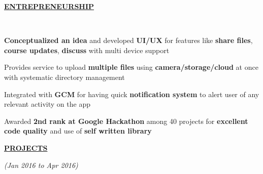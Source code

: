\documentclass[a4paper]{deedy-resume} %
\begin{document}

\sectionspace

{\uppercase\uline{\textbf{\large{Entrepreneurship}}\hfill}}
\microspace

\hfill \\

\begin{tightitemize}
\item \textbf{Conceptualized an idea} and developed \textbf{UI/UX} for features like \textbf{share files}, \textbf{course updates}, \textbf{discuss} with multi device support
\item Provides service to upload \textbf{multiple files} using \textbf{camera/storage/cloud} at once with systematic directory management
\item Integrated with \textbf{GCM} for having quick \textbf{notification system} to alert user of any relevant activity on the app
\item Awarded \textbf{2nd rank at Google Hackathon} among 40 projects for \textbf{excellent code quality} and use of \textbf{self written library}
\end{tightitemize}

\sectionspace


{\uppercase\uline{\textbf{\large{Projects}}\hfill}}

\microspace

\hfill {\textit{\small(Jan 2016 to Apr 2016)}}\\
\end{document}

